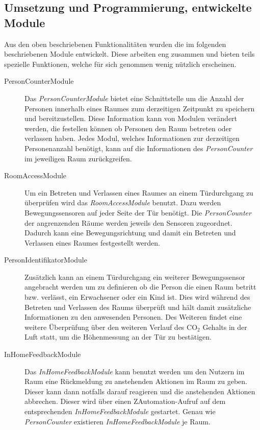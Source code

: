 \subsection{Umsetzung und Programmierung, entwickelte Module}
Aus den oben beschriebenen Funktionalitäten wurden die im folgenden beschriebenen Module entwickelt. Diese arbeiten eng zusammen und bieten teils spezielle Funktionen, welche für sich genommen wenig nützlich erscheinen.
\begin{description}

\item [PersonCounterModule] Das \emph{PersonCounterModule} bietet eine Schnittstelle um die Anzahl der Personen innerhalb eines Raumes zum derzeitigen Zeitpunkt zu speichern und bereitzustellen. Diese Information kann von Modulen verändert werden, die festellen können ob Personen den Raum betreten oder verlassen haben. Jedes Modul, welches Informationen zur derzeitigen Personenanzahl benötigt, kann auf die Informationen des \emph{PersonCounter} im jeweiligen Raum zurückgreifen.

\item [RoomAccessModule] Um ein Betreten und Verlassen eines Raumes an einem Türdurchgang zu überprüfen wird das \emph{RoomAccessModule} benutzt. Dazu werden Bewegungssensoren auf jeder Seite der Tür benötigt. Die \emph{PersonCounter} der angrenzenden Räume werden jeweils den Sensoren zugeordnet. Dadurch kann eine Bewegungsrichtung und damit ein Betreten und Verlassen eines Raumes festgestellt werden.

\item [PersonIdentifikatorModule] Zusätzlich kann an einem Türdurchgang ein weiterer Bewegungssensor angebracht werden um zu definieren ob die Person die einen Raum betritt bzw. verlässt, ein Erwachsener oder ein Kind ist. Dies wird während des Betreten und Verlassen des Raums überprüft und hält damit zusätzliche Informationen zu den anwesenden Personen. Des Weiteren findet eine weitere Überprüfung über den weiteren Verlauf des CO$_2$ Gehalts in der Luft statt, um die Höhenmessung an der Tür zu bestätigen.

\item [InHomeFeedbackModule] Das \emph{InHomeFeedbackModule} kann benutzt werden um den Nutzern im Raum eine Rückmeldung zu anstehenden Aktionen im Raum zu geben. Dieser kann dann notfalls darauf reagieren und die anstehenden Aktionen abbrechen. Dieser wird über einen ZAutomation-Aufruf auf dem entsprechenden \emph{InHomeFeedbackModule} gestartet. Genau wie \emph{PersonCounter} existieren \emph{InHomeFeedbackModule} je Raum.


\end{description}
